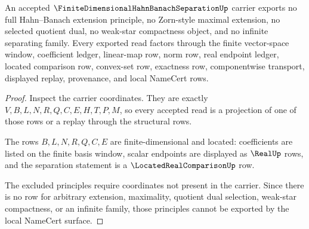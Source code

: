 \begin{theorem}
\label{thm:finite-dimensional-hahn-banach-separation-no-full-choice-escape}
An accepted $\FiniteDimensionalHahnBanachSeparationUp$ carrier exports no full Hahn--Banach extension principle, no Zorn-style maximal extension, no selected quotient dual, no weak-star compactness object, and no infinite separating family. Every exported read factors through the finite vector-space window, coefficient ledger, linear-map row, norm row, real endpoint ledger, located comparison row, convex-set row, exactness row, componentwise transport, displayed replay, provenance, and local NameCert rows.
\end{theorem}
\begin{proof}
Inspect the carrier coordinates. They are exactly $V,B,L,N,R,Q,C,E,H,T,P,M$, so every accepted read is a projection of one of those rows or a replay through the structural rows.

The rows $B,L,N,R,Q,C,E$ are finite-dimensional and located: coefficients are listed on the finite basis window, scalar endpoints are displayed as $\RealUp$ rows, and the separation statement is a $\LocatedRealComparisonUp$ row.

The excluded principles require coordinates not present in the carrier. Since there is no row for arbitrary extension, maximality, quotient dual selection, weak-star compactness, or an infinite family, those principles cannot be exported by the local NameCert surface.
\end{proof}




